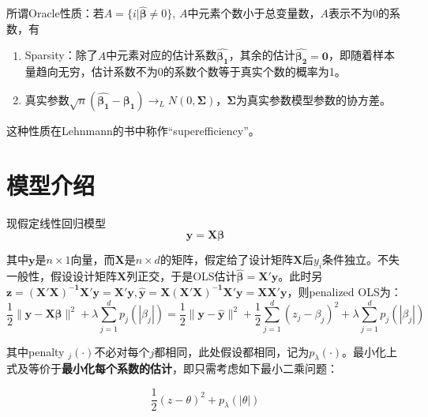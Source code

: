 ﻿\documentclass[hyperref,12pt]{ctexart}
\begin{document}
所谓Oracle性质：若$A= \{i | \hat{\boldsymbol{\beta}} \neq 0\}$, $A$中元素个数小于总变量数，$A$表示不为0的系数，有
\begin{enumerate}[(1)]
	\item Sparsity：除了$A$中元素对应的估计系数$\hat{\boldsymbol{\beta_1}}$，其余的估计$\hat{\boldsymbol{\beta_2}} = \mathbf{0}$，即随着样本量趋向无穷，估计系数不为0的系数个数等于真实个数的概率为1。
	\item 真实参数$\sqrt{n}(\hat{\boldsymbol{\beta_1}} - \boldsymbol{\beta_1}) \rightarrow_L N(0, \boldsymbol{\Sigma})$，$\boldsymbol{\Sigma}$为真实参数模型参数的协方差。
\end{enumerate}
这种性质在Lehnmann的书中称作“superefficiency”。

\section{模型介绍}
现假定线性回归模型
\[
\mathbf{y} = \mathbf{X}\boldsymbol{\beta}
\]

其中$\mathbf{y}$是$n\times 1$向量，而$\mathbf{X}$是$n \times d$的矩阵，假定给了设计矩阵$\mathbf{X}$后$y_i$条件独立。不失一般性，假设设计矩阵$\mathbf{X}$列正交，于是OLS估计$\hat{\boldsymbol{\beta}} = \mathbf{X'y}$。此时另$\mathbf{z} = \mathbf{(X'X)^{-1}X'y} = \mathbf{X'y}, \hat{\mathbf{y}} = \mathbf{X(X'X)^{-1}X'y} = \mathbf{XX'y}$，则penalized OLS为：
\begin{equation}
\frac{1}{2}\|\mathbf{y} - \mathbf{X}\boldsymbol{\beta}\|^2 + \lambda\sum_{j = 1}^d p_j(|\beta_j|) = \frac{1}{2}\|\mathbf{y} -\hat{\mathbf{y}}\|^2 + \frac{1}{2}\sum^d_{j = 1}(z_j - \beta_j)^2 + \lambda\sum_{j = 1}^d p_j(|\beta_j|)
\end{equation}

其中penalty $_j(\cdot)$不必对每个$j$都相同，此处假设都相同，记为$p_{\lambda}(\cdot)$。最小化上式及等价于\textbf{最小化每个系数的估计}，即只需考虑如下最小二乘问题：

\[
\frac{1}{2}(z - \theta)^2 + p_{\lambda}(|\theta|)
\]
\end{document}
